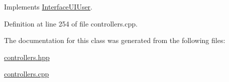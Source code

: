 Implements \hyperlink{class_interface_u_i_user_ad3e4efe4c7292c8a677fd8eeefcf6ae4}{Interface\+U\+I\+User}.



Definition at line 254 of file controllers.\+cpp.



The documentation for this class was generated from the following files\+:\begin{DoxyCompactItemize}
\item 
\hyperlink{controllers_8hpp}{controllers.\+hpp}\item 
\hyperlink{controllers_8cpp}{controllers.\+cpp}\end{DoxyCompactItemize}
